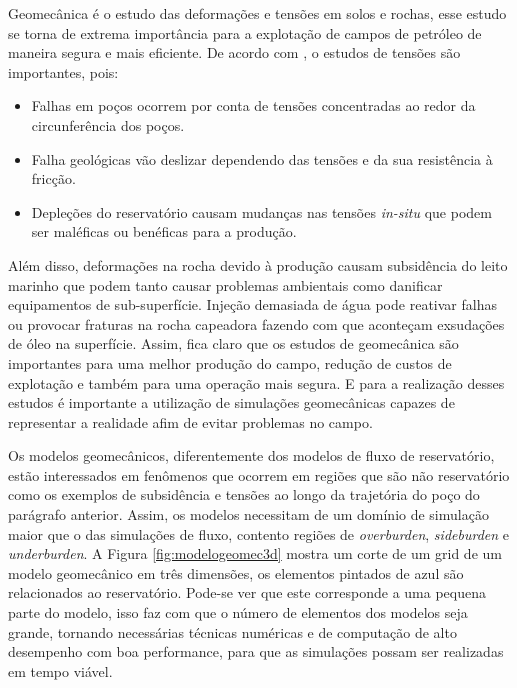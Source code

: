 

Geomecânica é o estudo das deformações e tensões em solos e rochas, esse estudo se torna de extrema importância para a explotação de campos de petróleo de maneira segura e mais eficiente. De acordo com \citet{ResGeomec}, o estudos de tensões são importantes, pois:

\begin{itemize}
    \item Falhas em poços ocorrem por conta de tensões concentradas ao redor da circunferência dos poços.
    \item Falha geológicas vão deslizar dependendo das tensões e da sua resistência à fricção. 
    \item Depleções do reservatório causam mudanças nas tensões \textit{in-situ} que podem ser maléficas ou benéficas para a produção.
\end{itemize}

Além disso, deformações na rocha devido à produção causam subsidência do leito marinho que podem tanto causar problemas ambientais como danificar equipamentos de sub-superfície. Injeção demasiada de água  pode reativar falhas ou provocar fraturas na rocha capeadora fazendo com que aconteçam exsudações de óleo na superfície. Assim, fica claro que os estudos de geomecânica são importantes para uma melhor produção do campo, redução de custos de explotação e também para uma operação mais segura.  E para a realização desses estudos é importante a utilização de simulações geomecânicas capazes de representar a realidade afim de evitar problemas no campo.

Os modelos geomecânicos, diferentemente dos modelos de fluxo de reservatório, estão interessados em fenômenos que ocorrem em regiões que são não reservatório como os exemplos de subsidência e tensões ao longo da trajetória do poço do parágrafo anterior. Assim, os modelos necessitam de um domínio de simulação maior que o das simulações de fluxo, contento regiões de \textit{overburden}, \textit{sideburden} e \textit{underburden}. A Figura \ref{fig:modelogeomec3d} mostra um corte de um grid de um modelo geomecânico em três dimensões, os elementos pintados de azul são relacionados ao reservatório. Pode-se ver que este corresponde a uma pequena parte do modelo, isso faz com que o número de elementos dos  modelos seja grande, tornando necessárias técnicas numéricas e de computação de alto desempenho com boa performance, para que as simulações possam ser realizadas em tempo viável. 


